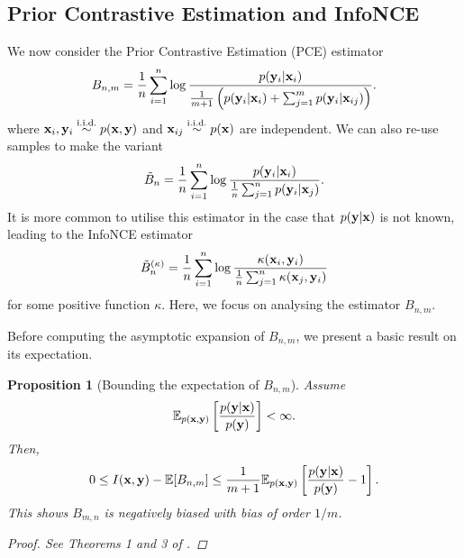 \documentclass[a4paper, 10pt]{report}
\theoremstyle{plain}
\newtheorem{proposition}[theorem]{Proposition}
\begin{document}
	\subsection{Prior Contrastive Estimation and InfoNCE}
	\label{sec:pce}
	
	We now consider the Prior Contrastive Estimation (PCE) estimator \citep{foster2020unified}
	\begin{equation}
	B_{n,m} = \frac{1}{n}\sum_{i=1}^n \log \frac{p({\mathbf{y}}_i|{\mathbf{x}}_i)}{\frac{1}{m+1}\left(p({\mathbf{y}}_i|{\mathbf{x}}_i) + \sum_{j=1}^m p({\mathbf{y}}_i|{\mathbf{x}}_{ij})  \right)}.
	\end{equation}
	where ${\mathbf{x}}_i,{\mathbf{y}}_i \overset{\scriptstyle{\text{i.i.d.}}}{\sim} p({\mathbf{x}},{\mathbf{y}})$ and ${\mathbf{x}}_{ij} \overset{\scriptstyle{\text{i.i.d.}}}{\sim} p({\mathbf{x}})$ are independent.
	We can also re-use samples to make the variant
	\begin{equation}
	\tilde{B}_n = \frac{1}{n}\sum_{i=1}^n \log \frac{p({\mathbf{y}}_i|{\mathbf{x}}_i)}{\frac{1}{n}\sum_{j=1}^n p({\mathbf{y}}_i|{\mathbf{x}}_j)}.
	\end{equation}
	It is more common to utilise this estimator in the case that $p({\mathbf{y}}|{\mathbf{x}})$ is not known, leading to the InfoNCE estimator \citep{oord2018representation}
	\begin{equation}
	\tilde{B}_n^{(\kappa)} = \frac{1}{n}\sum_{i=1}^n \log \frac{\kappa({\mathbf{x}}_i,{\mathbf{y}}_i)}{\frac{1}{n}\sum_{j=1}^n\kappa({\mathbf{x}}_j,{\mathbf{y}}_i) }
	\end{equation}
	for some positive function $\kappa$.
	Here, we focus on analysing the estimator $B_{n,m}$.
	
	Before computing the asymptotic expansion of $B_{n,m}$, we present a basic result on its expectation.
	\begin{proposition}[Bounding the expectation of $B_{n,m}$]
		Assume
		\begin{equation}
		\mathbb{E}_{p({\mathbf{x}},{\mathbf{y}})}\left[ \frac{p({\mathbf{y}}|{\mathbf{x}})}{p({\mathbf{y}})} \right] < \infty.
		\end{equation}
		Then,
		\begin{equation}
		0 \le I({\mathbf{x}},{\mathbf{y}}) - \mathbb{E}[B_{n,m}] \le \frac{1}{m+1}\mathbb{E}_{p({\mathbf{x}},{\mathbf{y}})}\left[ \frac{p({\mathbf{y}}|{\mathbf{x}})}{p({\mathbf{y}})} - 1 \right].
		\end{equation}
		This shows $B_{m,n}$ is negatively biased with bias of order $1/m$.
		\begin{proof}
			See Theorems 1 and 3 of \citet{foster2020unified}.
		\end{proof}
	\end{proposition}
	
\end{document}
